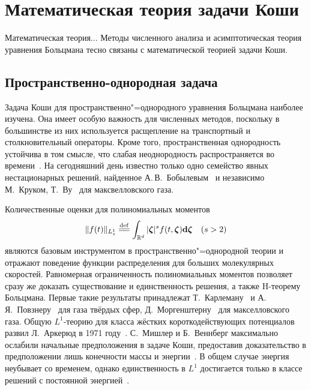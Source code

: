 \section{Математическая теория задачи Коши} \label{sect:cauchy}

Математическая теория...
Методы численного анализа и асимптотическая теория уравнения Больцмана тесно связаны
с математической теорией задачи Коши.


\subsection{Пространственно-однородная задача}

Задача Коши для пространственно"=однородного уравнения Больцмана наиболее изучена.
Она имеет особую важность для численных методов, поскольку в большинстве из них используется
расщепление на транспортный и столкновительный операторы.
Кроме того, пространственная однородность устойчива в том смысле, что
слабая неоднородность распространяется во времени~\cite{Arkeryd1987}.
На сегодняшний день известно только одно семейство явных нестационарных решений,
найденное А.\,В.~Бобылевым~\cite{Bobylev1975} и независимо М.~Круком, Т.~Ву~\cite{Krook1976} для максвелловского газа.

Количественные оценки для полиномиальных моментов
\begin{equation*}
    \|f(t)\|_{L^1_s} \eqdef \int_{\mathbb{R}^d} |\bzeta|^s f(t,\bzeta)\dzeta \quad (s>2)
\end{equation*}
являются базовым инструментом в пространственно"=однородной теории
и отражают поведение функции распределения для больших молекулярных скоростей.
Равномерная ограниченность полиномиальных моментов позволяет сразу же доказать
существование и единственность решения, а также H-теорему Больцмана.
Первые такие результаты принадлежат Т.~Карлеману~\cite{Carleman1933} и А.\,Я.~Повзнеру~\cite{Povzner1962}
для газа твёрдых сфер, Д.~Моргенштерну~\cite{Morgenstern1954} для макселловского газа.
Общую \(L^1\)-теорию для класса жёстких короткодействующих потенциалов развил Л.~Аркерюд в 1971 году~\cite{Arkeryd1972}.
С.~Мишлер и Б.~Веннберг максимально ослабили начальные предположения в задаче Коши,
предоставив доказательство в предположении лишь конечности массы и энергии~\cite{Mischler1999}.
В общем случае энергия неубывает со временем, однако единственность в \(L^1\) достигается
только в классе решений с постоянной энергией~\cite{Wennberg1999}.

